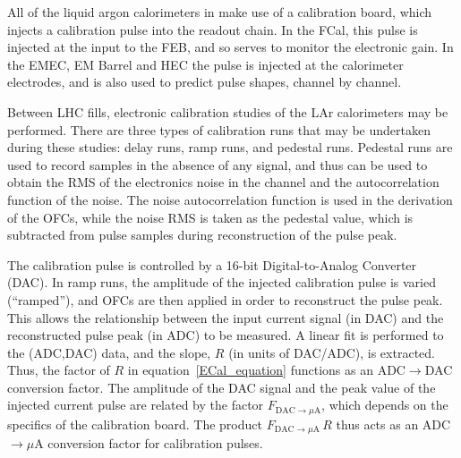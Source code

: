 All of the liquid argon calorimeters in \atlas make use of a calibration board, which injects a calibration pulse into the readout chain. In the FCal, this pulse is injected at the input to the FEB\cite{FCal_jinst_2010}, and so serves to monitor the electronic gain. In the EMEC, EM Barrel and HEC the pulse is injected at the calorimeter electrodes, and is also used to predict pulse shapes, channel by channel. 

Between LHC fills, electronic calibration studies of the LAr calorimeters may be performed. There are three types of calibration runs that may be undertaken during these studies: delay runs, ramp runs, and pedestal runs. Pedestal runs are used to record samples in the absence of any signal, and thus can be used to obtain the RMS of the electronics noise in the channel and the autocorrelation function of the noise. The noise autocorrelation function is used in the derivation of the OFCs, while the noise RMS is taken as the pedestal value, which is subtracted from pulse samples during reconstruction of the pulse peak.

 The calibration pulse is controlled by a 16-bit Digital-to-Analog Converter (DAC)\cite{LAr_Electronics}. In ramp runs, the amplitude of the injected calibration pulse is varied (``ramped''), and OFCs are then applied in order to reconstruct the pulse peak. This allows the relationship between the input current signal (in DAC) and the reconstructed pulse peak (in ADC) to be measured. A linear fit is performed to the (ADC,DAC) data, and the slope, $R$ (in units of DAC/ADC), is extracted. Thus, the factor of $R$ in equation~\ref{ECal_equation} functions as an ADC$\rightarrow$DAC conversion factor. The amplitude of the DAC signal and the peak value of the injected current pulse are related by the factor $F_{\mathrm{DAC}\rightarrow\mu\mathrm{A}}$, which depends on the specifics of the calibration board. The product $F_{\mathrm{DAC}\rightarrow\mu\mathrm{A}} \, R$ thus acts as an ADC$\rightarrow \mu$A conversion factor for calibration pulses.

%
%
%
%
%

